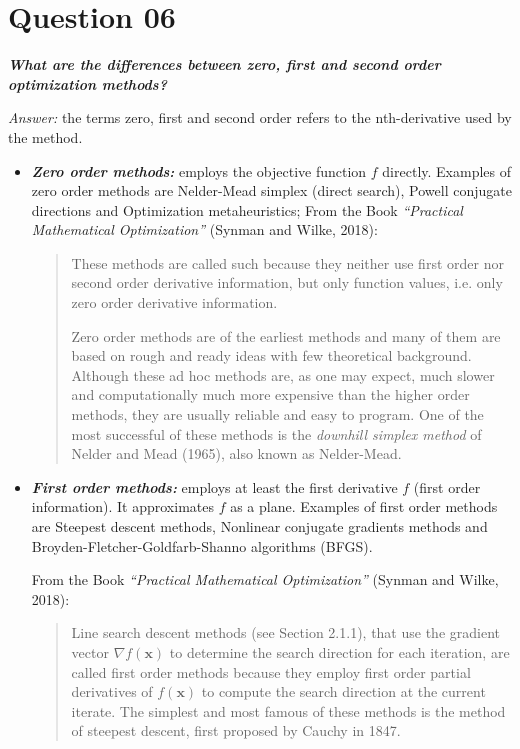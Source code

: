 \documentclass[conference]{IEEEtran}
\begin{document}
\section{Question 06}

\textbf{\textit{What are the differences between zero, first and second order optimization methods?}}

\textit{Answer:} the terms zero, first and second order refers to the nth-derivative used by the method.

\begin{itemize}
	\item \textbf{\textit{Zero order methods:}} employs the objective function $f$ directly. Examples of zero order methods are Nelder-Mead simplex (direct search),  Powell conjugate directions and Optimization metaheuristics;
	\subitem From the Book \textit{``Practical Mathematical Optimization''} (Synman and Wilke, 2018):
		\begin{quotation}
			These methods are called such because they neither use first order nor second order derivative information, but only function values, i.e. only zero order derivative information.
			
			Zero order methods are of the earliest methods and many of them	are based on rough and ready ideas with few theoretical background.	Although these ad hoc methods are, as one may expect, much slower and computationally much more expensive than the higher order methods, they are usually reliable and easy to program. One of the most
			successful of these methods is the \textit{downhill simplex method} of Nelder and Mead (1965), also known as Nelder-Mead.
			
		\end{quotation}
	
	\item \textbf{\textit{First order methods:}} employs at least the first derivative $f$ (first order information). It approximates $f$ as a plane. Examples of first order methods are Steepest descent methods, Nonlinear conjugate gradients methods and Broyden-Fletcher-Goldfarb-Shanno algorithms (BFGS).
	
	\subitem From the Book \textit{``Practical Mathematical Optimization''} (Synman and Wilke, 2018):
		\begin{quotation}
			Line search descent methods (see Section 2.1.1), that use the gradient vector $\nabla f(\mathbf{x})$  to determine the search direction for each iteration, are called first order methods because they employ first order partial derivatives of $f(\mathbf{x})$ to compute the search direction at the current iterate. The simplest and most famous of these methods is the method of steepest	descent, first proposed by Cauchy in 1847.
		\end{quotation}
	

\end{itemize}
\end{document}
